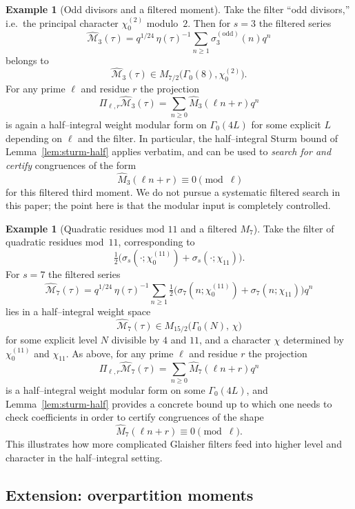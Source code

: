 \documentclass[11pt]{article}
\theoremstyle{definition}
\newtheorem{example}[theorem]{Example}
\theoremstyle{remark}
\begin{document}
\begin{example}[Odd divisors and a filtered moment]
Take the filter “odd divisors,'' i.e.\ the principal character
$\chi_0^{(2)}$ modulo~$2$. Then for $s=3$ the filtered series
\[
\widehat{\mathcal M}_3(\tau)
= q^{1/24}\,\eta(\tau)^{-1}\sum_{n\ge1}\sigma^{(\mathrm{odd})}_3(n)q^n
\]
belongs to
\[
\widehat{\mathcal M}_3(\tau)
\in M_{7/2}\bigl(\Gamma_0(8),\chi_0^{(2)}\bigr).
\]
For any prime $\ell$ and residue $r$ the projection
\[
\Pi_{\ell,r}\widehat{\mathcal M}_3(\tau)
=\sum_{n\ge0}\widehat{M}_3(\ell n+r)q^n
\]
is again a half--integral weight modular form on $\Gamma_0(4L)$ for some
explicit $L$ depending on $\ell$ and the filter.  In particular, the
half--integral Sturm bound of Lemma~\ref{lem:sturm-half} applies verbatim,
and can be used to \emph{search for and certify} congruences of the form
\[
\widehat{M}_3(\ell n+r)\equiv0\pmod{\ell}
\]
for this filtered third moment.  We do not pursue a systematic filtered
search in this paper; the point here is that the modular input is completely
controlled.
\end{example}

\begin{example}[Quadratic residues mod $11$ and a filtered $M_7$]
Take the filter of quadratic residues mod~$11$, corresponding to
\[
\tfrac12\big(\sigma_s(\cdot;\chi_0^{(11)})+\sigma_s(\cdot;\chi_{11})\big).
\]
For $s=7$ the filtered series
\[
\widehat{\mathcal M}_7(\tau)
= q^{1/24}\,\eta(\tau)^{-1}\sum_{n\ge1}
\tfrac12\big(\sigma_7(n;\chi_0^{(11)})+\sigma_7(n;\chi_{11})\big)q^n
\]
lies in a half--integral weight space
\[
\widehat{\mathcal M}_7(\tau)
\in M_{15/2}\bigl(\Gamma_0(N),\,\chi\bigr)
\]
for some explicit level $N$ divisible by $4$ and $11$, and a character
$\chi$ determined by $\chi_0^{(11)}$ and $\chi_{11}$.  As above, for any
prime $\ell$ and residue $r$ the projection
\[
\Pi_{\ell,r}\widehat{\mathcal M}_7(\tau)
=\sum_{n\ge0}\widehat{M}_7(\ell n+r)q^n
\]
is a half--integral weight modular form on some $\Gamma_0(4L)$, and
Lemma~\ref{lem:sturm-half} provides a concrete bound up to which one needs
to check coefficients in order to certify congruences of the shape
\[
\widehat{M}_7(\ell n+r)\equiv0\pmod{\ell}.
\]
This illustrates how more complicated Glaisher filters feed into higher
level and character in the half--integral setting.
\end{example}


\subsection{Extension: overpartition moments}\label{sec:overpartitions}
\end{document}
